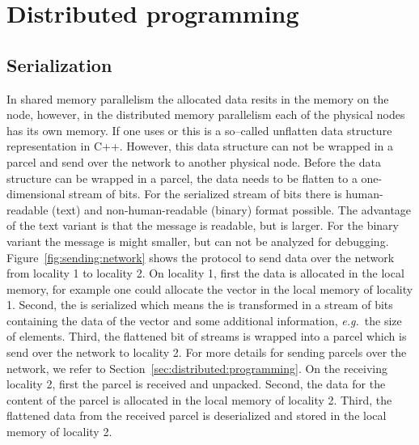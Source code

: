 \section{Distributed programming}

\subsection{Serialization}
In shared memory parallelism the allocated data resits in the memory on the node, however, in the distributed memory parallelism each of the physical nodes has its own memory. If one uses  or  this is a so--called unflatten data structure representation in C++. However, this data structure can not be wrapped in a parcel and send over the network to another physical node. Before the data structure can be wrapped in a parcel, the data needs to be flatten to a one-dimensional stream of bits. For the serialized stream of bits there is human-readable (text) and non-human-readable (binary) format possible. The advantage of the text variant is that the message is readable, but is larger. For the binary variant the message is might smaller, but can not be analyzed for debugging.\\

Figure~\ref{fig:sending:network} shows the protocol to send data over the network from locality 1 to locality 2. On locality 1, first the data is allocated in the local memory, for example one could allocate the vector  in the local memory of locality 1. Second, the  is serialized which means the  is transformed in a stream of bits containing the data of the vector and some additional information, \emph{e.g.}\ the size of elements. Third, the flattened bit of streams is wrapped into a parcel which is send over the network to locality 2. For more details for sending parcels over the network, we refer to Section~\ref{sec:distributed:programming}. On the receiving locality 2, first the parcel is received and unpacked. Second, the data for the content of the parcel is allocated in the local memory of locality 2. Third, the flattened data from the received parcel is deserialized and stored in the local memory of locality 2. \\

